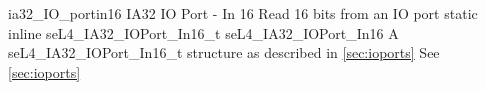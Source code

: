 %
%
%
%

\apidoc
{ia32_IO_portin16}
{IA32 IO Port - In 16}
{Read 16 bits from an IO port}
{static inline seL4\_IA32\_IOPort\_In16\_t seL4\_IA32\_IOPort\_In16}
{
}
{A seL4\_IA32\_IOPort\_In16\_t structure as described in \autoref{sec:ioports}}
{See \autoref{sec:ioports}}

